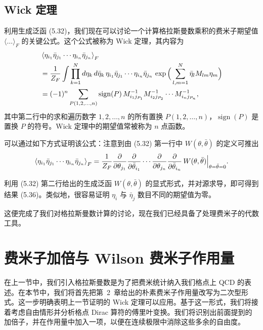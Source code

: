 \subsection{Wick 定理}

利用生成泛函 (5.32)，我们现在可以讨论一个计算格拉斯曼数乘积的费米子期望值 $\langle\ldots\rangle_F$ 的关键公式。这个公式被称为 Wick 定理，其内容为
\begin{equation}
  \begin{aligned}
    &\left\langle \eta_{i_1}\bar{\eta}_{j_1}\cdots\eta_{i_n}\bar{\eta}_{j_n} \right\rangle_F\\
    &= \frac{1}{Z_F}\int\prod_{k=1}^{N}d\eta_k\,d\bar{\eta}_k\,
      \eta_{i_1}\bar{\eta}_{j_1}\cdots\eta_{i_n}\bar{\eta}_{j_n}\,
      \exp\Big(\sum_{l,m=1}^{N}\bar{\eta}_l M_{lm}\eta_m\Big)\\
    &= (-1)^n\sum_{P(1,2,\ldots,n)}\operatorname{sign}(P)\,
      M^{-1}_{i_1 j_{P_1}}M^{-1}_{i_2 j_{P_2}}\cdots M^{-1}_{i_n j_{P_n}} ,
  \end{aligned}
\end{equation}
其中第二行中的求和遍历数字 $1, 2, \ldots, n$ 的所有置换 $P(1, 2, \ldots, n)$，$\operatorname{sign}(P)$ 是置换 $P$ 的符号。Wick 定理中的期望值常被称为 $n$ 点函数。

可以通过如下方式证明该公式：注意到由 (5.32) 第一行中 $W(\theta,\bar{\theta})$ 的定义可推出
\begin{equation}
  \left\langle \eta_{i_1}\bar{\eta}_{j_1}\cdots\eta_{i_n}\bar{\eta}_{j_n} \right\rangle_F
  = \frac{1}{Z_F}\frac{\partial}{\partial\theta_{j_1}}
    \frac{\partial}{\partial\bar{\theta}_{i_1}}\cdots
    \frac{\partial}{\partial\theta_{j_n}}
    \frac{\partial}{\partial\bar{\theta}_{i_n}}\,
    W(\theta,\bar{\theta})\Big|_{\theta=\bar{\theta}=0} .
\end{equation}

利用 (5.32) 第二行给出的生成泛函 $W(\theta,\bar{\theta})$ 的显式形式，并对源求导，即可得到结果 (5.36)。类似地，很容易证明 $\eta_i$ 与 $\bar{\eta}_j$ 数目不同的期望值为零。

这便完成了我们对格拉斯曼数计算的讨论，现在我们已经具备了处理费米子的代数工具。

\section{费米子加倍与 Wilson 费米子作用量}

在上一节中，我们引入格拉斯曼数是为了把费米统计纳入我们格点上 QCD 的表述。在本节中，我们将首先把第~2~章给出的朴素费米子作用量改写为二次型形式。这一步明确表明上一节证明的 Wick 定理可以应用。基于这一形式，我们将接着考虑自由情形并分析格点 Dirac 算符的傅里叶变换。我们将识别出前面提到的加倍子，并在作用量中加入一项，以便在连续极限中消除这些多余的自由度。


